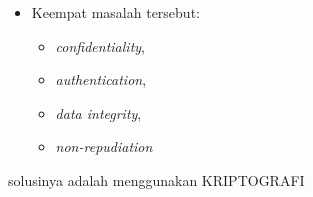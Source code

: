 \documentclass{article}
\begin{document}

\begin{itemize}
    \item Keempat masalah tersebut:
    \begin{itemize}
        \item \textit{confidentiality},
        \item \textit{authentication},
        \item \textit{data integrity},
        \item \textit{non-repudiation}
    \end{itemize}
\end{itemize}

solusinya adalah menggunakan KRIPTOGRAFI
\end{document}
